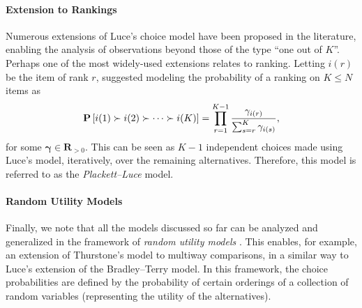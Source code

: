 \paragraph{Extension to Rankings}
Numerous extensions of Luce's choice model have been proposed in the literature, enabling the analysis of observations beyond those of the type ``one out of $K$''.
Perhaps one of the most widely-used extensions relates to ranking.
Letting $i(r)$ be the item of rank $r$, \citet{plackett1975analysis} suggested modeling the probability of a ranking on $K \le N$ items as
\begin{align*}
\mathbf{P}\left[ i(1) \succ i(2) \succ \cdots \succ i(K) \right] = \prod_{r = 1}^{K - 1} \frac{\gamma_{i(r)}}{\sum_{s = r}^K \gamma_{i(s)}},
\end{align*}
for some $\bm{\gamma} \in \mathbf{R}_{>0}$.
This can be seen as $K-1$ independent choices made using Luce's model, iteratively, over the remaining alternatives.
Therefore, this model is referred to as the \emph{Plackett--Luce} model.

\paragraph{Random Utility Models}
Finally, we note that all the models discussed so far can be analyzed and generalized in the framework of \emph{random utility models} \citep{train2009discrete}.
This enables, for example, an extension of Thurstone's model to multiway comparisons, in a similar way to Luce's extension of the Bradley--Terry model.
In this framework, the choice probabilities are defined by the probability of certain orderings of a collection of random variables (representing the utility of the alternatives).

